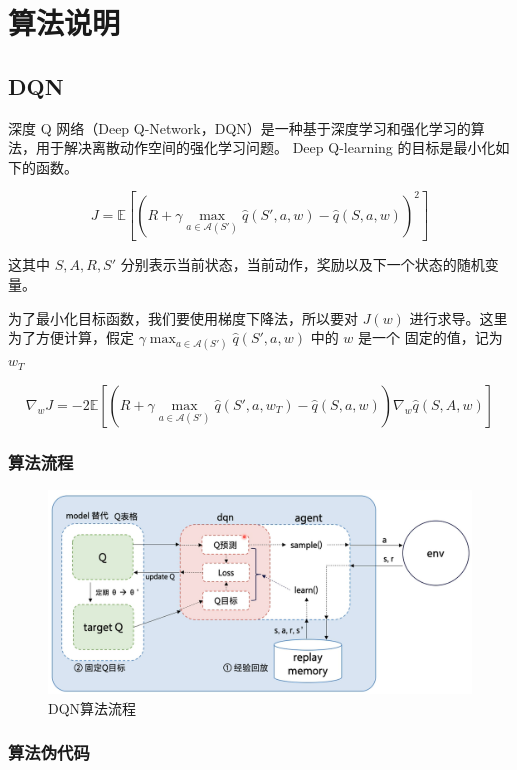 \section{算法说明}

\subsection{DQN}
深度 Q 网络（Deep Q-Network，DQN）是一种基于深度学习和强化学习的算法，用于解决离散动作空间的强化学习问题。
Deep Q-learning  的目标是最小化如下的函数。

\[
J = \mathbb{E} \left[ \left( R + \gamma \max_{a \in \mathcal{A}(S')} \hat{q}(S', a, w) - \hat{q}(S,a,w)\right)^2 \right]
\]

这其中 $S,A,R,S'$ 分别表示当前状态，当前动作，奖励以及下一个状态的随机变量。

为了最小化目标函数，我们要使用梯度下降法，所以要对 $J(w)$ 进行求导。这里为了方便计算，假定 $\gamma \max_{a \in \mathcal{A}(S')} \hat{q}(S', a, w)$ 中的 $w$ 是一个
固定的值，记为 $w_T$

\[
\nabla_w J= -2\mathbb{E} \left[ \left( R + \gamma \max_{a \in \mathcal{A}(S')} \hat{q}(S', a, w_T) - \hat{q}(S,a,w)\right) \nabla_w \hat{q}(S,A,w)\right]
\]



\subsubsection{算法流程}
\begin{figure}[H]
    \centering
    \includegraphics[width=0.8\linewidth]{pic/DQN-process.png}
    \caption{ DQN算法流程}
    \label{dqn-example}
\end{figure}

\subsubsection{算法伪代码}

